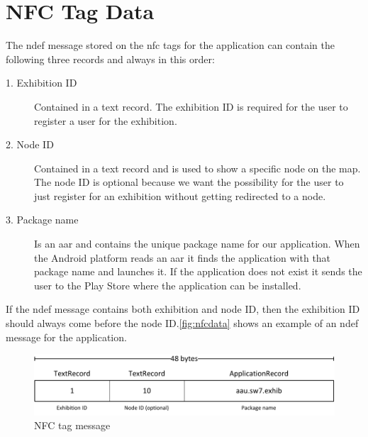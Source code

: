 \section{NFC Tag Data}
\label{sec:nfcdata}

The \ac{ndef} message stored on the \ac{nfc} tags for the application can contain the following three records and always in this order:

\begin{description}
\item[1. Exhibition ID] Contained in a text record. The exhibition ID is required for the user to register a user for the exhibition.
\item[2. Node ID] Contained in a text record and is used to show a specific node on the map. The node ID is optional because we want the possibility for the user to just register for an exhibition without getting redirected to a node.
\item[3. Package name] Is an \ac{aar} and contains the unique package name for our application. When the Android platform reads an \ac{aar} it finds the application with that package name and launches it. If the application does not exist it sends the user to the Play Store where the application can be installed.
\end{description}
If the \ac{ndef} message contains both exhibition and node ID, then the exhibition ID should always come before the node ID.\autoref{fig:nfcdata} shows an example of an \ac{ndef} message for the application.

\begin{figure}[H]
\centering
\includegraphics[width=0.97\columnwidth]{img/nfctag.pdf}
\caption{NFC tag message}
\label{fig:nfcdata}
\end{figure}
